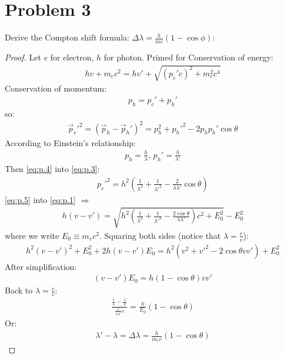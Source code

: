 \documentclass{article}
\numberwithin{equation}{subsection} %
\theoremstyle{definition}
\begin{document}
\section{Problem 3}
Derive the Compton shift formula:
$\Delta\lambda=\frac{h}{mc}(1-\cos{\phi})$:
\begin{proof}

    Let $e$ for electron, $h$ for photon. Primed for  Conservation of energy: 
    \begin{align}
        \label{eq:p.1}
        hv+ m_ec^2 = hv' + \sqrt{(p_e'c)^2+m_e^2c^4}
    \end{align}
    Conservation of momentum:
    \begin{align}
        \label{eq:p.2}
        p_h = p_e' + p_h'
    \end{align}
    so:
    \begin{align}
        \label{eq:p.3}
        \vec{p}_e'^2 = 
        (\vec{p}_h - \vec{p}_h')^2 = p_h^2+p_h'^2-2p_h p_h'\cos{\theta}
    \end{align}
    According to Einstein's relationship:
    \begin{align}
        \label{eq:p.4}
        p_h = \frac{h}{\lambda},\, p_h'=\frac{h}{\lambda'}
    \end{align}
    Then \ref{eq:p.4} into \ref{eq:p.3}:
    \begin{align}
        \label{eq:p.5}
        p_e'^2= 
          h^2 \left(\frac{1}{\lambda^2}+\frac{1}{\lambda'^2}-
          \frac{2}{\lambda\lambda'}\cos{\theta}\right)
    \end{align}
    \ref{eq:p.5} into \ref{eq:p.1} $\Rightarrow$
    \begin{align}
        \label{eq:p.6}
        h(v-v') =
        \sqrt{h^2\left(
            \frac{1}{\lambda^2}+\frac{1}{\lambda'^2}
            -\frac{2\cos{\theta}}{\lambda\lambda'}\right) c^2
            +E_0^2}
        -E_0^2
    \end{align}
    where we write $E_0\equiv m_e c^2$. Squaring both sides (notice that
    $\lambda=\frac{c}{v}$):
    \begin{align}
        \label{eq:p.7}
        h^2(v-v')^2+E_0^2 +2h(v-v')E_0 = 
        h^2\left(v^2+v'^2-2\cos{\theta}vv'\right)+E_0^2
    \end{align}
    After simplification:
    \begin{align}
        \label{eq:p.8}
        (v-v')E_0 = h(1-\cos{\theta})vv'
    \end{align}
    Back to $\lambda=\frac{c}{v}$:
    \begin{align}
        \label{eq:p.9}
        \frac{\frac{1}{\lambda}-\frac{1}{\lambda'}}
            {\frac{1}{\lambda\lambda'}c}
            =\frac{h}{E_0} (1-\cos{\theta})
    \end{align}
    Or:
    \begin{align}
        \label{eq:p.10}
        \lambda'-\lambda = \Delta\lambda = \frac{h}{m_e c}(1-\cos{\theta})
    \end{align}
\end{proof}
\end{document}
